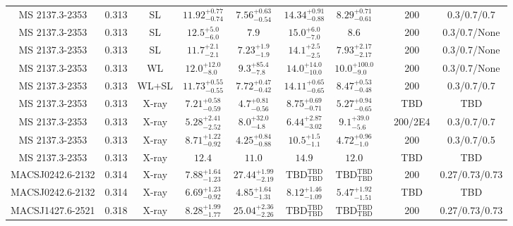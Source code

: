 \begin{table}
\begin{tabular}{cccccccccc}
MS 2137.3-2353 & 0.313 & SL & ${11.92}^{+0.77}_{-0.74}$ & ${7.56}^{+0.63}_{-0.54}$ & ${14.34}^{+0.91}_{-0.88}$ & ${8.29}^{+0.71}_{-0.61}$ & \citet{GA05.2} & 200 & 0.3/0.7/0.7 \\
MS 2137.3-2353 & 0.313 & SL & ${12.5}^{+5.0}_{-6.0}$ & ${7.9}^{}_{}$ & ${15.0}^{+6.0}_{-7.0}$ & ${8.6}^{}_{}$ & \citet{GA03.1} & 200 & 0.3/0.7/None \\
MS 2137.3-2353 & 0.313 & SL & ${11.7}^{+2.1}_{-2.1}$ & ${7.23}^{+1.9}_{-1.9}$ & ${14.1}^{+2.5}_{-2.5}$ & ${7.93}^{+2.17}_{-2.17}$ & \citet{GA02.2} & 200 & 0.3/0.7/None \\
MS 2137.3-2353 & 0.313 & WL & ${12.0}^{+12.0}_{-8.0}$ & ${9.3}^{+85.4}_{-7.8}$ & ${14.0}^{+14.0}_{-10.0}$ & ${10.0}^{+100.0}_{-9.0}$ & \citet{GA03.1} & 200 & 0.3/0.7/None \\
MS 2137.3-2353 & 0.313 & WL+SL & ${11.73}^{+0.55}_{-0.55}$ & ${7.72}^{+0.47}_{-0.42}$ & ${14.11}^{+0.65}_{-0.65}$ & ${8.47}^{+0.53}_{-0.48}$ & \citet{GA05.2} & 200 & 0.3/0.7/0.7 \\
MS 2137.3-2353 & 0.313 & X-ray & ${7.21}^{+0.58}_{-0.59}$ & ${4.7}^{+0.81}_{-0.56}$ & ${8.75}^{+0.69}_{-0.71}$ & ${5.27}^{+0.94}_{-0.65}$ & \citet{SC06.1} & TBD & TBD \\
MS 2137.3-2353 & 0.313 & X-ray & ${5.28}^{+2.41}_{-2.52}$ & ${8.0}^{+32.0}_{-4.8}$ & ${6.44}^{+2.87}_{-3.02}$ & ${9.1}^{+39.0}_{-5.6}$ & \citet{VO06.1} & 200/2E4 & 0.3/0.7/0.7 \\
MS 2137.3-2353 & 0.313 & X-ray & ${8.71}^{+1.22}_{-0.92}$ & ${4.25}^{+0.84}_{-0.88}$ & ${10.5}^{+1.5}_{-1.1}$ & ${4.72}^{+0.96}_{-1.0}$ & \citet{AL03.1} & 200 & 0.3/0.7/0.5 \\
MS 2137.3-2353 & 0.313 & X-ray & ${12.4}^{}_{}$ & ${11.0}^{}_{}$ & ${14.9}^{}_{}$ & ${12.0}^{}_{}$ & \citet{MO99.1} & TBD & TBD \\
MACSJ0242.6-2132 & 0.314 & X-ray & ${7.88}^{+1.64}_{-1.23}$ & ${27.44}^{+1.99}_{-2.19}$ & ${\mathrm{TBD}}^{\mathrm{TBD}}_{\mathrm{TBD}}$ & ${\mathrm{TBD}}^{\mathrm{TBD}}_{\mathrm{TBD}}$ & \citet{BA14.1} & 200 & 0.27/0.73/0.73 \\
MACSJ0242.6-2132 & 0.314 & X-ray & ${6.69}^{+1.23}_{-0.92}$ & ${4.85}^{+1.64}_{-1.31}$ & ${8.12}^{+1.46}_{-1.09}$ & ${5.47}^{+1.92}_{-1.51}$ & \citet{SC06.1} & TBD & TBD \\
MACSJ1427.6-2521 & 0.318 & X-ray & ${8.28}^{+1.99}_{-1.77}$ & ${25.04}^{+2.36}_{-2.26}$ & ${\mathrm{TBD}}^{\mathrm{TBD}}_{\mathrm{TBD}}$ & ${\mathrm{TBD}}^{\mathrm{TBD}}_{\mathrm{TBD}}$ & \citet{BA14.1} & 200 & 0.27/0.73/0.73 \\

\end{tabular}
\end{table}
